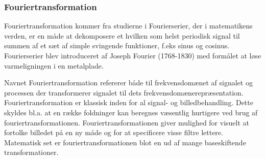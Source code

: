\subsubsection{Fouriertransformation}
Fouriertransformation kommer fra studierne i Fourierserier, der i matematikens verden, er en måde at dekomposere et hvilken som helst periodisk signal til summen af et sæt af simple svingende funktioner, f.eks sinus og cosinus. Fourierserier blev introduceret af Joseph Fourier (1768-1830) med formålet at løse varmeligningen i en metalplade.

Navnet Fouriertransformation refererer både til frekvensdomænet af signalet og processen der transformerer signalet til dets frekvensdomænerepræsentation. Fouriertransformation er klassisk inden for al signal- og billedbehandling. Dette skyldes bl.a. at en række foldninger kan beregnes væsentlig hurtigere ved brug af fouriertransformationen. Fouriertransformationen giver mulighed for visuelt at fortolke billedet på en ny måde og for at specificere visse filtre lettere. Matematisk set er fouriertransformationen blot en ud af mange baseskiftende transformationer.



